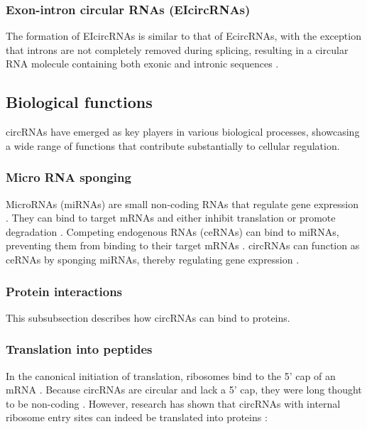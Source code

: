 \subsubsection{Exon-intron circular RNAs (EIcircRNAs)}
The formation of EIcircRNAs is similar to that of EcircRNAs, with the exception
that introns are not completely removed during splicing, resulting in a circular
RNA molecule containing both exonic and intronic sequences
\supercite{xiao_circular_2022}.

\subsection{Biological functions}
circRNAs have emerged as key players in various biological processes, showcasing
a wide range of functions that contribute substantially to cellular regulation.

\subsubsection{Micro RNA sponging}
MicroRNAs (miRNAs) are small non-coding RNAs that regulate gene expression
\supercite{bartel_micrornas_2009}. They can bind to target mRNAs and either
inhibit translation or promote degradation \supercite{bartel_micrornas_2009}.
Competing endogenous RNAs (ceRNAs) can bind to miRNAs, preventing them from
binding to their target mRNAs \supercite{tay_multilayered_2014}. circRNAs can
function as ceRNAs by sponging miRNAs, thereby regulating gene expression
\supercite{xiao_circular_2022}.

\subsubsection{Protein interactions}
This subsubsection describes how circRNAs can bind to proteins.

\subsubsection{Translation into peptides}
In the canonical initiation of translation, ribosomes bind to the 5' cap of an
mRNA \supercite{hinnebusch_mechanism_2012}. Because circRNAs are circular and
lack a 5' cap, they were long thought to be non-coding
\supercite{bao_regulatory_2019,greene_circular_2017}. However, research has
shown that circRNAs with internal ribosome entry sites can indeed be translated
into proteins \supercite{chen_expanding_2020}:

